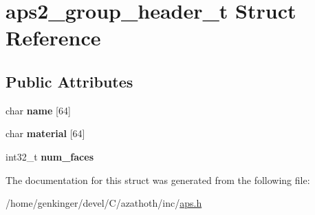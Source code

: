 \hypertarget{structaps2__group__header__t}{}\section{aps2\+\_\+group\+\_\+header\+\_\+t Struct Reference}
\label{structaps2__group__header__t}
\subsection*{Public Attributes}
\begin{DoxyCompactItemize}
\item 
\mbox{\label{structaps2__group__header__t_a6f7e6a3be244c69ef8d91157f19717c5}} 
char {\bfseries name} \mbox{[}64\mbox{]}
\item 
\mbox{\label{structaps2__group__header__t_aa857d31f920de9af0fa2f88c14f88c10}} 
char {\bfseries material} \mbox{[}64\mbox{]}
\item 
\mbox{\label{structaps2__group__header__t_a06dd430976cd199fd5a641627852503f}} 
int32\+\_\+t {\bfseries num\+\_\+faces}
\end{DoxyCompactItemize}


The documentation for this struct was generated from the following file\+:\begin{DoxyCompactItemize}
\item 
/home/genkinger/devel/\+C/azathoth/inc/\mbox{\hyperlink{aps_8h}{aps.\+h}}\end{DoxyCompactItemize}
